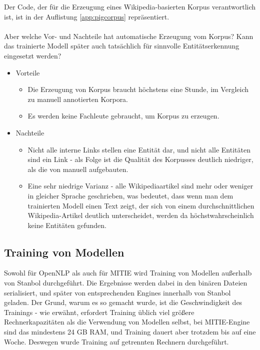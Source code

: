 Der Code, der für die Erzeugung eines Wikipedia-basierten Korpus verantwortlich ist, ist in der Auflistung \ref{app:pigcorpus} repräsentiert.

\paragraph{}
Aber welche Vor- und Nachteile hat automatische Erzeugung vom Korpus? Kann das trainierte Modell später auch tatsächlich für sinnvolle Entitätserkennung eingesetzt werden?
\begin{itemize}
\item Vorteile
\begin{itemize}
\item Die Erzeugung von Korpus braucht höchstens eine Stunde, im Vergleich zu manuell annotierten Korpora.
\item Es werden keine Fachleute gebraucht, um Korpus zu erzeugen.
\end{itemize}
\item Nachteile
\begin{itemize}
\item Nicht alle interne Links stellen eine Entität dar, und nicht alle Entitäten sind ein Link - als Folge ist die Qualität des Korpusses deutlich niedriger, als die von manuell aufgebauten.
\item Eine sehr niedrige Varianz - alle Wikipediaartikel sind mehr oder weniger in gleicher Sprache geschrieben, was bedeutet, dass wenn man dem trainierten Modell einen Text zeigt, der sich von einem durchschnittlichen Wikipedia-Artikel deutlich unterscheidet, werden da höchstwahrscheinlich keine Entitäten gefunden.
\end{itemize}
\end{itemize}

\subsection{Training von Modellen} \label{subsec:TRMODELLS}
Sowohl für OpenNLP als auch für MITIE wird Training von Modellen außerhalb von Stanbol durchgeführt. Die Ergebnisse werden dabei in den binären Dateien serialisiert, und später von entsprechenden Engines innerhalb von Stanbol geladen. Der Grund, warum es so gemacht wurde, ist die Geschwindigkeit des Trainings - wie erwähnt, erfordert Training üblich viel größere Rechnerkapazitäten als die Verwendung von Modellen selbst, bei MITIE-Engine sind das mindestens 24 GB RAM, und Training dauert aber trotzdem bis auf eine Woche. Deswegen wurde Training auf getrennten Rechnern durchgeführt.

